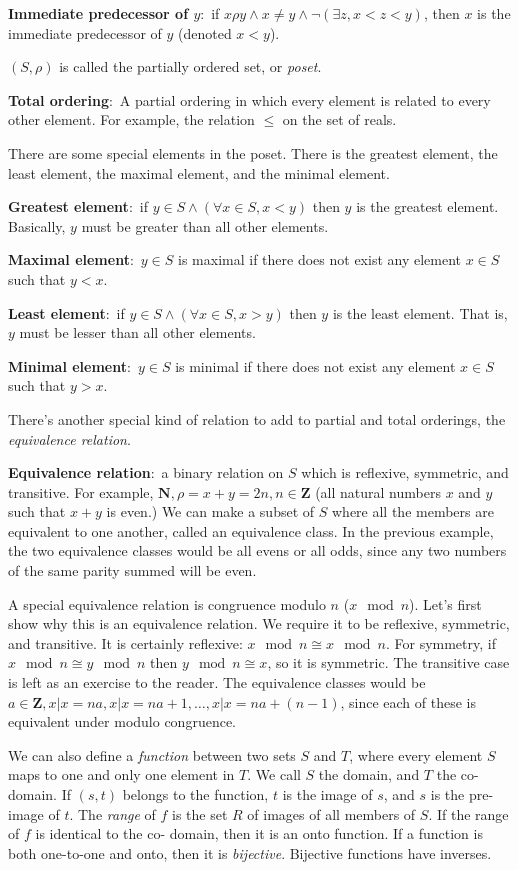 \documentclass[nobib]{tufte-handout}
\newcommand{\defn}[2]{\noindent\textbf{#1}:\ #2}
\begin{document}
\defn{Immediate predecessor of $y$}{if $x\rho y \land x \neq y \land \neg (\exists z, x < z< y)$, then $x$ is the 
immediate predecessor of $y$ (denoted $x<y$)}. 

$(S, \rho)$ is called the partially ordered set, or \emph{poset}. 

\defn{Total ordering}{A partial ordering in which every element is related to 
every other element}. For example, the relation $\leq$ on the set of reals. 

There are some special elements in the poset. There is the greatest element, 
the least element, the maximal element, and the minimal element. 

\defn{Greatest element}{if $y \in S \land (\forall x \in S, x<y)$
then $y$ is the greatest element}. Basically, $y$ must be greater 
than all other elements. 

\defn{Maximal element}{$y\in S$ is maximal if there does not exist any 
element $x \in S$ such that $y < x$.}

\defn{Least element}{if $y \in S \land (\forall x \in S, x>y)$
then $y$ is the least element}. That is, $y$ must be lesser 
than all other elements. 

\defn{Minimal element}{$y\in S$ is minimal if there does not exist any 
element $x \in S$ such that $y > x$.}

There's another special kind of relation to add to partial and total 
orderings, the \emph{equivalence relation}. 

\defn{Equivalence relation}{a binary relation on $S$ which is 
reflexive, symmetric, and transitive}. For example, $\mathbf{N}, \rho = x + y = 2n, n \in \mathbf{Z}$
(all natural numbers $x$ and $y$ such that $x+y$ is even.)
We can make a subset of $S$ where all the members are equivalent to one another, 
called an equivalence class. In the previous example, the two equivalence 
classes would be all evens or all odds, since any two numbers of the same 
parity summed will be even. 

A special equivalence relation is congruence modulo $n$ ($x \mod n$). 
Let's first show why this is an equivalence relation. We require it to be 
reflexive, symmetric, and transitive. It is certainly reflexive: $x \mod n \cong x \mod n$. 
For symmetry, if $x \mod n \cong y \mod n$ then $y \mod n \cong x$, so it is symmetric. 
The transitive case is left as an exercise to the reader. The equivalence classes would be 
$a \in \mathbf{Z}, {x | x = na}, {x | x = na + 1}, \dots, {x | x = na + (n-1)}$, since each 
of these is equivalent under modulo congruence. 

We can also define a \emph{function} between two sets $S$ and $T$, where 
every element $S$ maps to one and only one element in $T$. We call $S$ the domain, 
and $T$ the co-domain. If $(s, t)$ belongs to the function, $t$ is the
image of $s$, and $s$ is the pre-image of $t$. The \emph{range} of $f$ is the set $R$
of images of all members of $S$.
If the range of $f$ is identical to the co-
domain, then it is an onto function. If a function is both one-to-one 
and onto, then it is \emph{bijective}. Bijective functions have inverses. 
\end{document}
